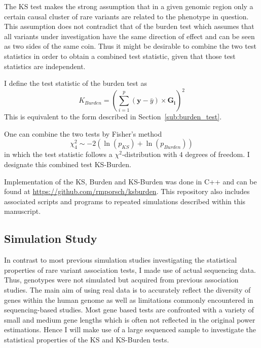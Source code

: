 The KS test makes the strong assumption that in a given genomic region only a certain causal cluster of rare variants are related to the phenotype in question.
This assumption does not contradict that of the burden test which assumes that all variants under investigation have the same direction of effect and can be seen as two sides of the same coin.
Thus it might be desirable to combine the two test statistics in order to obtain a combined test statistic, given that those test statistics are independent.

I define the test statistic of the burden test as 
\begin{equation}\label{eq:burden_simple}
  K_{Burden} = (\sum^p_{i=1} (\bm{y}-\bar{y}) \times \bm{G_i})^2
\end{equation}
This is equivalent to the form described in Section~\ref{sub:burden_test}.

One can combine the two tests by Fisher's method 
\begin{equation}
	\chi^2_4 \sim - 2 (\ln(p_{KS}) + \ln(p_{Burden}))
\end{equation}
in which the test statistic follows a $\chi^2$-distribution with $4$ degrees of freedom.
I designate this combined test KS-Burden.

Implementation of the KS, Burden and KS-Burden was done in C++ and can be found at \url{https://github.com/rmporsch/ksburden}.
This repository also includes associated scripts and programs to repeated simulations described within this manuscript.

\subsection{Simulation Study}
\label{sub:simulation_study}

In contrast to most previous simulation studies investigating the statistical properties of rare variant association tests, I made use of actual sequencing data.
Thus, genotypes were not simulated but acquired from previous association studies.
The main aim of using real data is to accurately reflect the diversity of genes within the human genome as well as limitations commonly encountered in sequencing-based studies.
Most gene based tests are confronted with a variety of small and medium gene lengths which is often not reflected in the original power estimations.
Hence I will make use of a large sequenced sample to investigate the statistical properties of the KS and KS-Burden tests.

